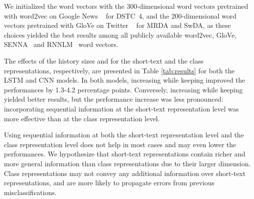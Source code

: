 \documentclass[11pt,letterpaper]{article}
\begin{document}
 We initialized the word vectors with the 300-dimensional word vectors pretrained with word2vec on Google News
~\cite{mikolov2013efficient,mikolov2013distributed} for DSTC~4, and the 200-dimensional word vectors pretrained with GloVe on Twitter
~\cite{pennington2014glove} for MRDA and SwDA, as these choices yielded the best results among all publicly available word2vec, GloVe, SENNA~\cite{collobert2011deep,collobert2011natural} and RNNLM~\cite{mikolov2011rnnlm} word vectors.









The effects of the history sizes  and  for the short-text and the class representations, respectively,
are presented in Table \ref{tab:results} for both the LSTM and CNN models. In both models, increasing   while keeping 
improved the performances by 1.3-4.2 percentage points. Conversely, increasing  while keeping  yielded better results, but the performance increase was less pronounced:
incorporating sequential information at the short-text representation level was more effective than at the class representation level. 


Using sequential information at both the short-text representation level and the class representation level does not help in most cases and may even lower the performances.
We hypothesize that short-text representations contain richer and more general information than class representations due to their larger dimension. Class representations may not convey any additional information over short-text representations, and are more likely to propagate errors from previous misclassifications. 
\end{document}
